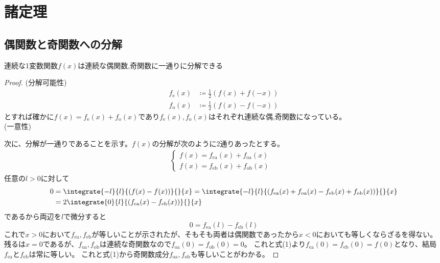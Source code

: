 \chapter{諸定理}
    \section{偶関数と奇関数への分解}
        \begin{shadebox}
            連続な1変数関数$f(x)$は連続な偶関数,奇関数に一通りに分解できる
        \end{shadebox}
        \def\fe{f_\mathrm{e}}
        \def\fo{f_\mathrm{o}}
        \def\fea{f_\mathrm{ea}}
        \def\foa{f_\mathrm{oa}}
        \def\feb{f_\mathrm{eb}}
        \def\fob{f_\mathrm{ob}}
        \begin{proof}
            \quad\par
            (分解可能性)\\
            \begin{align*}
                \fe(x) &\coloneq \frac{1}{2}\left(f(x)+f(-x)\right)\\
                \fo(x) &\coloneq \frac{1}{2}\left(f(x)-f(-x)\right)
            \end{align*}
            とすれば確かに$f(x)=\fe(x)+\fo(x)$であり$\fe(x),\fo(x)$はそれぞれ連続な偶,奇関数になっている。\\
            \newline
            (一意性)
            \par
            次に、分解が一通りであることを示す。$f(x)$の分解が次のように2通りあったとする。
            \begin{align}
                \begin{cases}
                f(x) = \fea(x) + \foa(x) & \\
                f(x) = \feb(x) + \fob(x) &
                \end{cases}
            \end{align}
            任意の$l>0$に対して
            \begin{align*}
                0 &= \integrate{-l}{l}{\left(f(x)-f(x)\right)}{}{x} = \integrate{-l}{l}{\left(\fea(x) + \foa(x) - \feb(x) + \fob(x)\right)}{}{x} \\
                &= 2\integrate{0}{l}{\left(\fea(x)-\feb(x)\right)}{}{x}
            \end{align*}
            であるから両辺を$l$で微分すると
            \[0 = \fea(l) - \feb(l)\]
            これで$x>0$において$\fea,\feb$が等しいことが示されたが、そもそも両者は偶関数であったから$x<0$においても等しくならざるを得ない。
            残るは$x=0$であるが、$\foa,\fob$は連続な奇関数なので$\foa(0)=\fob(0)=0$。
            これと式(1)より$ \fea(0) = \feb(0) = f(0)$となり、結局$\fea$と$\feb$は常に等しい。
            これと式(1)から奇関数成分$\foa,\fob$も等しいことがわかる。
        \end{proof}
